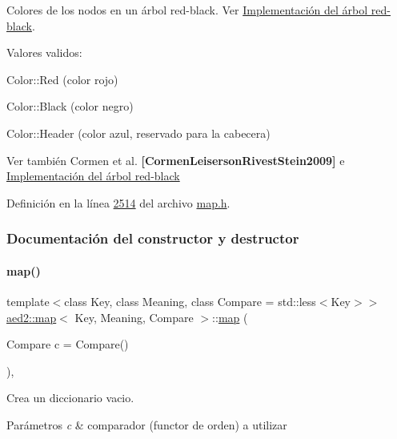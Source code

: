 Colores de los nodos en un árbol red-\/black. Ver \hyperlink{Implementacion}{Implementación del árbol red-\/black}. 

Valores validos\+: \begin{DoxyItemize}
\item Color\+::\+Red (color rojo) \item Color\+::\+Black (color negro) \item Color\+::\+Header (color azul, reservado para la cabecera)\end{DoxyItemize}
\begin{DoxySeeAlso}{Ver también}
Cormen et al. {\bfseries [Cormen\+Leiserson\+Rivest\+Stein2009]} e \hyperlink{Implementacion}{Implementación del árbol red-\/black} 
\end{DoxySeeAlso}


Definición en la línea \hyperlink{map_8h_source_l02514}{2514} del archivo \hyperlink{map_8h_source}{map.\+h}.



\subsubsection{Documentación del constructor y destructor}
\mbox{\label{classaed2_1_1map_a64da1d965b13eb28cdb3837bc17a18cf_a64da1d965b13eb28cdb3837bc17a18cf}} 
\paragraph{\texorpdfstring{map()}{map()}\hspace{0.1cm}{\footnotesize\ttfamily [1/3]}}
{\footnotesize\ttfamily template$<$class Key, class Meaning, class Compare = std\+::less$<$\+Key$>$$>$ \\
\hyperlink{classaed2_1_1map}{aed2\+::map}$<$ Key, Meaning, Compare $>$\+::\hyperlink{classaed2_1_1map}{map} (\begin{DoxyParamCaption}\item[{Compare}]{c = {\ttfamily Compare()} }\end{DoxyParamCaption})\hspace{0.3cm}{\ttfamily [inline]}, {\ttfamily [explicit]}}



Crea un diccionario vacio. 


\begin{DoxyParams}{Parámetros}
{\em c} & comparador (functor de orden) a utilizar \\
\hline
\end{DoxyParams}

